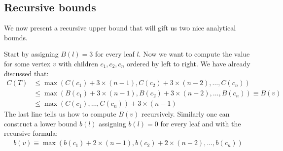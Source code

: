 \documentclass{article}
\begin{document}
\subsection{Recursive bounds}
We now present a recursive upper bound that will gift us two nice analytical bounds.

Start by assigning $B(l) = 3$ for every leaf $l$. Now we want to compute the value for some vertex $v$ with children $c_1, c_2, c_n$ ordered by left to right. We have already discussed that:
\begin{align*}
    C(T) &\leq \max(C(c_1)+3\times(n-1), C(c_2)+3\times(n-2),\dots, C(c_n))\\
    &\leq \max(B(c_1)+3\times(n-1), B(c_2)+3\times(n-2),\dots, B(c_n)) \equiv B(v)\\
    &\leq \max(C(c_1), \dots, C(c_n)) + 3\times(n-1)
\end{align*}
The last line tells us how to compute $B(v)$ recursively. Similarly one can construct a lower bound $b(l)$ assigning $b(l)=0$ for every leaf and with the recursive formula:
\begin{align*}
    b(v) \equiv \max(b(c_1)+2\times(n-1), b(c_2)+2\times(n-2),\dots, b(c_n))
\end{align*}
\end{document}
